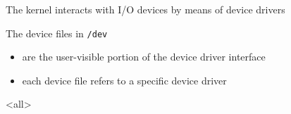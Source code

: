 \begin{frame}
  The kernel interacts with I/O devices by means of device drivers
  \begin{block}{The device files in \texttt{/dev}}
    \begin{itemize}
    \item are the user-visible portion of the device driver interface
    \item each device file refers to a specific device driver
    \end{itemize}
  \end{block}
\end{frame}
\mode<all>
